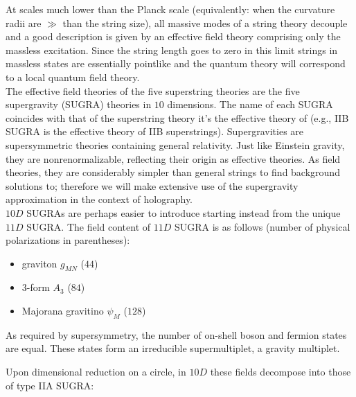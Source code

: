 

At scales much lower than the Planck scale (equivalently: when the curvature radii are $\gg$ than the string size), all massive modes of a string theory decouple and a good description is given by an effective field theory comprising only the massless excitation. Since the string length goes to zero in this limit strings in massless states are essentially pointlike and the quantum theory will correspond to a local quantum field theory.\\

The effective field theories of the five superstring theories are the five supergravity (SUGRA) theories in $10$ dimensions. The name of each SUGRA coincides with that of the superstring theory it's the effective theory of (e.g., IIB SUGRA is the effective theory of IIB superstrings). Supergravities are supersymmetric theories containing general relativity. Just like Einstein gravity, they are nonrenormalizable, reflecting their origin as effective theories. As field theories, they are considerably simpler than general strings to find background solutions to; therefore we will make extensive use of the supergravity approximation in the context of holography.\\

$10D$ SUGRAs are perhaps easier to introduce starting instead from the unique $11D$ SUGRA. The field content of $11D$ SUGRA is as follows (number of physical polarizations in parentheses):

\begin{itemize}
\item graviton $g_{MN}$ ($44$)
\item 3-form $A_3$ ($84$)
\item Majorana gravitino $\psi_M$ ($128$)
\end{itemize}

As required by supersymmetry, the number of on-shell boson and fermion states are equal. These states form an irreducible supermultiplet, a gravity multiplet.

Upon dimensional reduction on a circle, in $10D$ these fields decompose into those of type IIA SUGRA:

